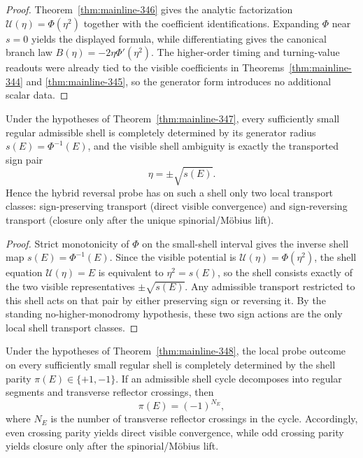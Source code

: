 \begin{proof}
Theorem~\ref{thm:mainline-346} gives the analytic factorization $\mathcal U(\eta)=\Phi(\eta^2)$ together with the coefficient identifications. Expanding $\Phi$ near $s=0$ yields the displayed formula, while differentiating gives the canonical branch law $B(\eta)=-2\eta\Phi'(\eta^2)$. The higher-order timing and turning-value readouts were already tied to the visible coefficients in Theorems~\ref{thm:mainline-344} and \ref{thm:mainline-345}, so the generator form introduces no additional scalar data.
\end{proof}


\begin{proposition}
\label{prop:app-c-34-8}
Under the hypotheses of Theorem~\ref{thm:mainline-347}, every sufficiently small regular admissible shell is completely determined by its generator radius $s(E)=\Phi^{-1}(E)$, and the visible shell ambiguity is exactly the transported sign pair
\[
  \eta=\pm\sqrt{s(E)}.
\]
Hence the hybrid reversal probe has on such a shell only two local transport classes: sign-preserving transport (direct visible convergence) and sign-reversing transport (closure only after the unique spinorial/M\"obius lift).
\end{proposition}

\begin{proof}
Strict monotonicity of $\Phi$ on the small-shell interval gives the inverse shell map $s(E)=\Phi^{-1}(E)$. Since the visible potential is $\mathcal U(\eta)=\Phi(\eta^2)$, the shell equation $\mathcal U(\eta)=E$ is equivalent to $\eta^2=s(E)$, so the shell consists exactly of the two visible representatives $\pm\sqrt{s(E)}$. Any admissible transport restricted to this shell acts on that pair by either preserving sign or reversing it. By the standing no-higher-monodromy hypothesis, these two sign actions are the only local shell transport classes.
\end{proof}


\begin{proposition}
\label{prop:app-c-34-9}
Under the hypotheses of Theorem~\ref{thm:mainline-348}, the local probe outcome on every sufficiently small regular shell is completely determined by the shell parity $\pi(E)\in\{+1,-1\}$. If an admissible shell cycle decomposes into regular segments and transverse reflector crossings, then
\[
  \pi(E)=(-1)^{N_E},
\]
where $N_E$ is the number of transverse reflector crossings in the cycle. Accordingly, even crossing parity yields direct visible convergence, while odd crossing parity yields closure only after the spinorial/M\"obius lift.
\end{proposition}


